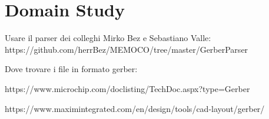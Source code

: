 \section{Domain Study}

	Usare il parser dei colleghi Mirko Bez e Sebastiano Valle:
	https://github.com/herrBez/MEMOCO/tree/master/GerberParser
	
	
	Dove trovare i file in formato gerber:
	
	https://www.microchip.com/doclisting/TechDoc.aspx?type=Gerber
	
	https://www.maximintegrated.com/en/design/tools/cad-layout/gerber/
	
	